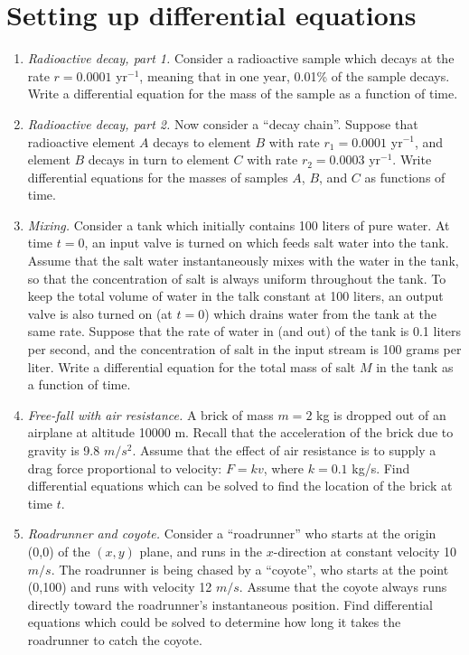 \documentclass[aps,prd,superscriptaddress,groupedaddress,nofootinbib,nobibnotes]{revtex4}
\begin{document}
\section{Setting up differential equations}

\begin{enumerate}[resume]
\item {\em Radioactive decay, part 1.} Consider a radioactive sample which decays
  at the rate $r = 0.0001$ yr$^{-1}$, meaning that in one year, 0.01\% of the sample decays.
  Write a differential equation for the mass of the sample as a function of time.

\item {\em Radioactive decay, part 2.} Now consider a ``decay chain''.  Suppose that radioactive
  element $A$ decays to element $B$ with rate $r_1 = 0.0001$ yr$^{-1}$, and element $B$ decays in
  turn to element $C$ with rate $r_2 = 0.0003$ yr$^{-1}$.  Write differential equations for the
  masses of samples $A$, $B$, and $C$ as functions of time.

\item {\em Mixing.} Consider a tank which initially contains 100 liters of pure water.
  At time $t=0$, an input valve is turned on which feeds salt water into the tank.
  Assume that the salt water instantaneously mixes with the water in the tank, so that the
  concentration of salt is always uniform throughout the tank.
  To keep the total volume of water in the talk constant at 100 liters, an output valve
  is also turned on (at $t=0$) which drains water from the tank at the same rate.
  Suppose that the rate of water in (and out) of the tank is 0.1 liters per second, and
  the concentration of salt in the input stream is 100 grams per liter.
  Write a differential equation for the total mass of salt $M$ in the tank as a function of time.

\item {\em Free-fall with air resistance.} A brick of mass $m = 2$ kg is dropped out of an airplane at 
  altitude 10000 m.  Recall that the acceleration of the brick due to gravity is 9.8 $m/s^2$.  Assume
  that the effect of air resistance is to supply a drag force proportional to velocity: $F = kv$,
  where $k = 0.1$ kg/s.
  Find differential equations which can be solved to find the location of the brick at time $t$.

\item {\em Roadrunner and coyote.} Consider a ``roadrunner'' who starts at the origin (0,0) of the
  $(x,y)$ plane, and runs in the $x$-direction at constant velocity 10 $m/s$.  The roadrunner is
  being chased by a ``coyote'', who starts at the point (0,100) and runs with velocity 12 $m/s$.
  Assume that the coyote always runs directly toward the roadrunner's instantaneous position.
  Find differential equations which could be solved to determine how long it takes the roadrunner
  to catch the coyote.
\end{enumerate}
\end{document}
